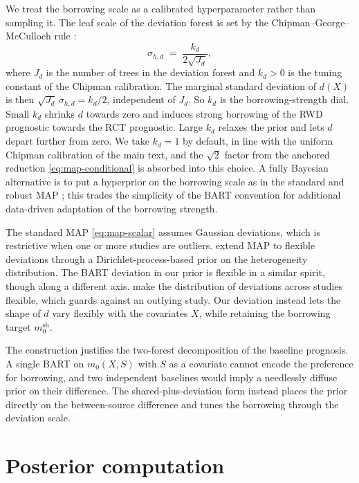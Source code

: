 We treat the borrowing scale as a calibrated hyperparameter rather than sampling it.
The leaf scale of the deviation forest is set by the Chipman--George--McCulloch rule \citep{chipman2010bart}:
\begin{equation}
\sigma_{h, d} \;=\; \frac{k_d}{2\sqrt{J_d}},
\label{eq:map-sigma-d}
\end{equation}
where $J_d$ is the number of trees in the deviation forest and $k_d > 0$ is the tuning constant of the Chipman calibration.
The marginal standard deviation of $d(X)$ is then $\sqrt{J_d}\, \sigma_{h, d} = k_d / 2$, independent of $J_d$.
So $k_d$ is the borrowing-strength dial.
Small $k_d$ shrinks $d$ towards zero and induces strong borrowing of the RWD prognostic towards the RCT prognostic.
Large $k_d$ relaxes the prior and lets $d$ depart further from zero.
We take $k_d = 1$ by default, in line with the uniform Chipman calibration of the main text, and the $\sqrt{2}$ factor from the anchored reduction \eqref{eq:map-conditional} is absorbed into this choice.
A fully Bayesian alternative is to put a hyperprior on the borrowing scale as in the standard and robust MAP \citep{neuenschwander2010, schmidli2014robust}; this trades the simplicity of the BART convention for additional data-driven adaptation of the borrowing strength.

The standard MAP \eqref{eq:map-scalar} assumes Gaussian deviations, which is restrictive when one or more studies are outliers.
\citet{hupf2021bayesian} extend MAP to flexible deviations through a Dirichlet-process-based prior on the heterogeneity distribution.
The BART deviation in our prior is flexible in a similar spirit, though along a different axis.
\citet{hupf2021bayesian} make the distribution of deviations across studies flexible, which guards against an outlying study.
Our deviation instead lets the shape of $d$ vary flexibly with the covariates $X$, while retaining the borrowing target $m_0^{\mathrm{sh}}$.

The construction justifies the two-forest decomposition of the baseline prognosis.
A single BART on $m_0(X, S)$ with $S$ as a covariate cannot encode the preference for borrowing, and two independent baselines would imply a needlessly diffuse prior on their difference.
The shared-plus-deviation form instead places the prior directly on the between-source difference and tunes the borrowing through the deviation scale.

\newpage
\section{Posterior computation}\label{sm:posterior-computation}

